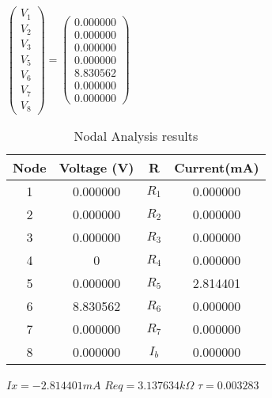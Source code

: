$ \left(\begin{array}{c} V_1 \\ V_2 \\ V_3 \\ V_5 \\ V_6 \\ V_7 \\ V_8 \end{array}\right)= \left(\begin{array}{c} 0.000000 \\ 0.000000 \\ 0.000000 \\ 0.000000 \\ 8.830562 \\ 0.000000 \\ 0.000000 \end{array}\right) $
 \begin{table}[H]
 \footnotesize
 \centering
 \caption{Nodal Analysis results}
 \label{tab:tables}
 \begin{center}
 \begin{tabular}{cccc}
\hline 
 Node & Voltage (V) & R & Current(mA) \\ 
 \hline 
 1 & 0.000000& $R_1$ & 0.000000 \\ 
 \hline 
 2& 0.000000 & $R_2$ & 0.000000\\ 
 \hline 
 3 & 0.000000& $R_3$ & 0.000000 \\ 
 \hline 
 4 & 0 &$R_4$ & 0.000000 \\ 
 \hline 
5 &0.000000& $R_5$ & 2.814401\\ 
 \hline 
 6 & 8.830562 & $R_6$ & 0.000000\\ 
 \hline 
 7 & 0.000000 & $R_7$ & 0.000000\\ 
 \hline 
 8 & 0.000000 & $I_b$ & 0.000000 \\ 
 \hline 
 \end{tabular} 
 \end{center} 
 \end{table}
 $Ix=-2.814401 mA$  $Req=3.137634 k\Omega$ $\tau=0.003283$